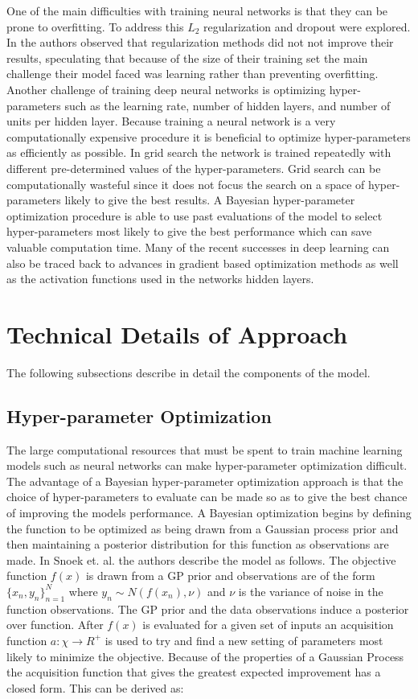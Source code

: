 \documentclass[12pt,letterpaper]{article}
\begin{document}
One of the main difficulties with training neural networks is that they can be prone to overfitting.  To address this $L_2$ regularization and dropout were explored.  In \cite{Baldi:2014pta} the authors observed that regularization methods did not not improve their results, speculating that because of the size of their training set the main challenge their model faced was learning rather than preventing overfitting.  Another challenge of training deep neural networks is optimizing hyper-parameters such as the learning rate, number of hidden layers, and number of units per hidden layer.  Because training a neural network is a very computationally expensive procedure it is beneficial to optimize hyper-parameters as efficiently as possible.  In grid search the network is trained repeatedly with different pre-determined values of the hyper-parameters.  Grid search can be computationally wasteful since it does not focus the search on a space of hyper-parameters likely to give the best results.  A Bayesian hyper-parameter optimization procedure is able to use past evaluations of the model to select hyper-parameters most likely to give the best performance which can save valuable computation time.  Many of the recent successes in deep learning can also be traced back to advances in gradient based optimization methods as well as the activation functions used in the networks hidden layers.

\section{Technical Details of Approach}

The following subsections describe in detail the components of the model. 

\subsection{Hyper-parameter Optimization}
The large computational resources that must be spent to train machine learning models such as neural networks can make hyper-parameter optimization difficult.  The advantage of a Bayesian hyper-parameter optimization approach is that the choice of hyper-parameters to evaluate can be made so as to give the best chance of improving the models performance. A Bayesian optimization begins by defining the function to be optimized as being drawn from a Gaussian process prior and then maintaining a posterior distribution for this function as observations are made. In Snoek et. al. \cite{Snoek:2012:PBO:2999325.2999464} the authors describe the model as follows.  The objective function $f(x)$ is drawn from a GP prior and observations are of the form $\{x_n,y_n\}_{n=1}^N$ where $y_n \sim N(f(x_n), \nu)$ and $\nu$ is the variance of noise in the function observations.  The GP prior and the data observations induce a posterior over function. After $f(x)$ is evaluated for a given set of inputs an acquisition function $a : \chi \rightarrow R^+$ is used to try and find a new setting of parameters most likely to minimize the objective.  Because of the properties of a Gaussian Process the acquisition function that gives the greatest expected improvement has a closed form.  This can be derived as:
\end{document}
